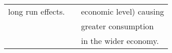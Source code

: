 \begin{table}
\begin{center}
\begin{tabular}{ r l l }
long run effects.                  &                                              & economic level) causing  \\
                                   &                                              & greater consumption  \\
                                   &                                              & in the wider economy. \\
\bottomrule
\end{tabular}
\end{center}
\end{table}
